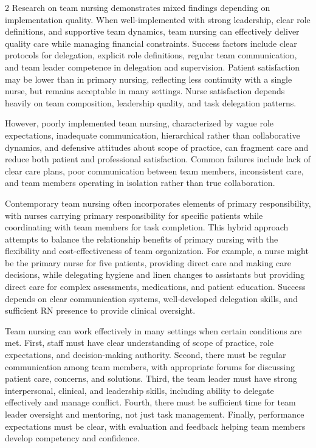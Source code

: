 \documentclass[12pt]{article}
\begin{document}
\begin{multicols}{2}
Research on team nursing demonstrates mixed findings depending on implementation quality. When well-implemented with strong leadership, clear role definitions, and supportive team dynamics, team nursing can effectively deliver quality care while managing financial constraints. Success factors include clear protocols for delegation, explicit role definitions, regular team communication, and team leader competence in delegation and supervision. Patient satisfaction may be lower than in primary nursing, reflecting less continuity with a single nurse, but remains acceptable in many settings. Nurse satisfaction depends heavily on team composition, leadership quality, and task delegation patterns.

However, poorly implemented team nursing, characterized by vague role expectations, inadequate communication, hierarchical rather than collaborative dynamics, and defensive attitudes about scope of practice, can fragment care and reduce both patient and professional satisfaction. Common failures include lack of clear care plans, poor communication between team members, inconsistent care, and team members operating in isolation rather than true collaboration.

Contemporary team nursing often incorporates elements of primary responsibility, with nurses carrying primary responsibility for specific patients while coordinating with team members for task completion. This hybrid approach attempts to balance the relationship benefits of primary nursing with the flexibility and cost-effectiveness of team organization. For example, a nurse might be the primary nurse for five patients, providing direct care and making care decisions, while delegating hygiene and linen changes to assistants but providing direct care for complex assessments, medications, and patient education. Success depends on clear communication systems, well-developed delegation skills, and sufficient RN presence to provide clinical oversight.

Team nursing can work effectively in many settings when certain conditions are met. First, staff must have clear understanding of scope of practice, role expectations, and decision-making authority. Second, there must be regular communication among team members, with appropriate forums for discussing patient care, concerns, and solutions. Third, the team leader must have strong interpersonal, clinical, and leadership skills, including ability to delegate effectively and manage conflict. Fourth, there must be sufficient time for team leader oversight and mentoring, not just task management. Finally, performance expectations must be clear, with evaluation and feedback helping team members develop competency and confidence.


\end{multicols}
\end{document}

